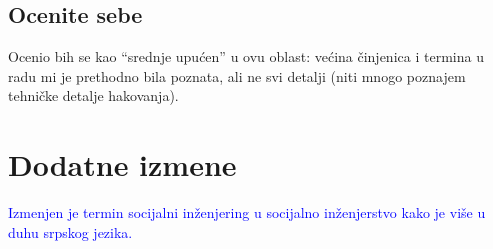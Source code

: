 \documentclass[a4paper]{report}
\newcommand{\odgovor}[1]{\textcolor{blue}{#1}}
\begin{document}
\section{Ocenite sebe}
Ocenio bih se kao ``srednje upućen'' u ovu oblast: većina činjenica i termina u radu mi je prethodno bila poznata, ali ne svi detalji (niti mnogo poznajem tehničke detalje hakovanja).



\chapter{Dodatne izmene}

\odgovor{Izmenjen je termin socijalni inženjering u socijalno inženjerstvo kako je više u duhu srpskog jezika.}
\end{document}

